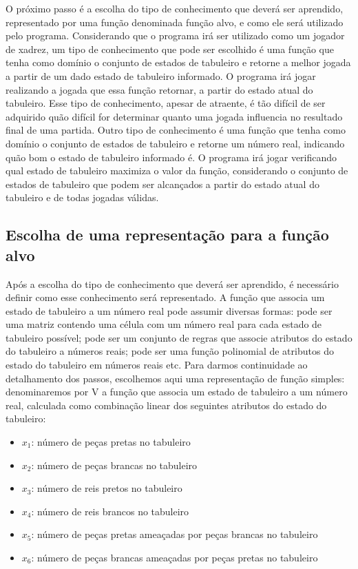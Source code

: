 O próximo passo é a escolha do tipo de conhecimento que deverá ser aprendido, representado por uma função denominada função alvo, e como ele será utilizado pelo programa. Considerando que o programa irá ser utilizado como um jogador de xadrez, um tipo de conhecimento que pode ser escolhido é uma função que tenha como domínio o conjunto de estados de tabuleiro e retorne a melhor jogada a partir de um dado estado de tabuleiro informado. O programa irá jogar realizando a jogada que essa função retornar, a partir do estado atual do tabuleiro. Esse tipo de conhecimento, apesar de atraente, é tão difícil de ser adquirido quão difícil for determinar quanto uma jogada influencia no resultado final de uma partida. Outro tipo de conhecimento é uma função que tenha como domínio o conjunto de estados de tabuleiro e retorne um número real, indicando quão bom o estado de tabuleiro informado é. O programa irá jogar verificando qual estado de tabuleiro maximiza o valor da função, considerando o conjunto de estados de tabuleiro que podem ser alcançados a partir do estado atual do tabuleiro e de todas jogadas válidas.

\subsection{Escolha de uma representação para a função alvo}

Após a escolha do tipo de conhecimento que deverá ser aprendido, é necessário definir como esse conhecimento será representado. A função que associa um estado de tabuleiro a um número real pode assumir diversas formas: pode ser uma matriz contendo uma célula com um número real para cada estado de tabuleiro possível; pode ser um conjunto de regras que associe atributos do estado do tabuleiro a números reais; pode ser uma função polinomial de atributos do estado do tabuleiro em números reais etc. Para darmos continuidade ao detalhamento dos passos, escolhemos aqui uma representação de função simples: denominaremos por V a função que associa um estado de tabuleiro a um número real, calculada como combinação linear dos seguintes atributos do estado do tabuleiro:

\begin{itemize}
\item $x_1$: número de peças pretas no tabuleiro
\item $x_2$: número de peças brancas no tabuleiro
\item $x_3$: número de reis pretos no tabuleiro
\item $x_4$: número de reis brancos no tabuleiro
\item $x_5$: número de peças pretas ameaçadas por peças brancas no tabuleiro
\item $x_6$: número de peças brancas ameaçadas por peças pretas no tabuleiro
\end{itemize}

